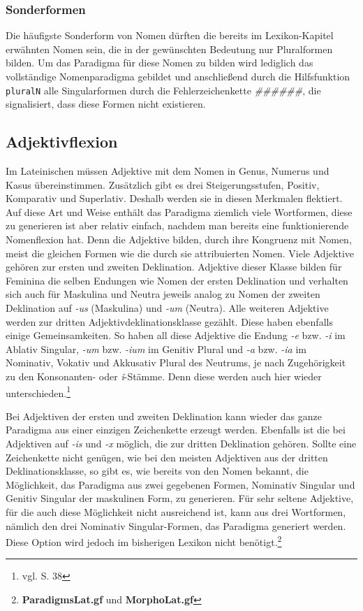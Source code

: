 \subsubsection{Sonderformen}
Die häufigste Sonderform von Nomen dürften die bereits im Lexikon-Kapitel erwähnten Nomen sein, die in der gewünschten Bedeutung nur Pluralformen bilden. Um das Paradigma für diese Nomen zu bilden wird lediglich das vollständige Nomenparadigma gebildet und anschließend durch die Hilfsfunktion \texttt{pluralN} alle Singularformen durch die Fehlerzeichenkette \textit{\#\#\#\#\#\#}, die signalisiert, dass diese Formen nicht existieren.
\subsection{Adjektivflexion}
\label{subsec:adjektiv}
Im Lateinischen müssen Adjektive mit dem Nomen in Genus, Numerus und Kasus übereinstimmen. Zusätzlich gibt es drei Steigerungsstufen, Positiv, Komparativ und Superlativ. Deshalb werden sie in diesen Merkmalen flektiert. Auf diese Art und Weise enthält das Paradigma ziemlich viele Wortformen, diese zu generieren ist aber relativ einfach, nachdem man bereits eine funktionierende Nomenflexion hat. Denn die Adjektive bilden, durch ihre Kongruenz mit Nomen, meist die gleichen Formen wie die durch sie attribuierten Nomen. Viele Adjektive gehören zur ersten und zweiten Deklination. Adjektive dieser Klasse bilden für Feminina die selben Endungen wie Nomen der ersten Deklination und verhalten sich auch für Maskulina und Neutra jeweils analog zu Nomen der zweiten Deklination auf \textit{-us} (Maskulina) und \textit{-um} (Neutra). Alle weiteren Adjektive werden zur dritten Adjektivdeklinationsklasse gezählt. Diese haben ebenfalls einige Gemeinsamkeiten. So haben all diese Adjektive die Endung \textit{-e} bzw. \textit{-i} im Ablativ Singular, \textit{-um} bzw. \textit{-ium} im Genitiv Plural und \textit{-a} bzw. \textit{-ia} im Nominativ, Vokativ und Akkusativ Plural des Neutrums, je nach Zugehörigkeit zu den Konsonanten- oder \textit{ǐ}-Stämme. Denn diese werden auch hier wieder unterschieden.\footnote{vgl. \cite{BAYER-LINDAUER1994} S. 38} \par
Bei Adjektiven der ersten und zweiten Deklination kann wieder das ganze Paradigma aus einer einzigen Zeichenkette erzeugt werden. Ebenfalls ist die bei Adjektiven auf \textit{-is} und \textit{-x} möglich, die zur dritten Deklination gehören. Sollte eine Zeichenkette nicht genügen, wie bei den meisten Adjektiven aus der dritten Deklinationsklasse, so gibt es, wie bereits von den Nomen bekannt, die Möglichkeit, das Paradigma aus zwei gegebenen Formen, Nominativ Singular und Genitiv Singular der maskulinen Form, zu generieren. Für sehr seltene Adjektive, für die auch diese Möglichkeit nicht ausreichend ist, kann aus drei Wortformen, nämlich den drei Nominativ Singular-Formen, das Paradigma generiert werden. Diese Option wird jedoch im bisherigen Lexikon nicht benötigt.\footnote{\textbf{ParadigmsLat.gf} und \textbf{MorphoLat.gf}} \par

